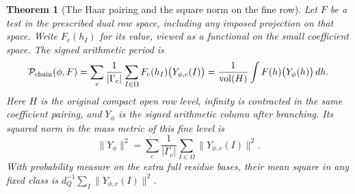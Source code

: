 \documentclass[a4paper,11pt]{article}
\newtheorem{theorem}[proposition]{Theorem}
\theoremstyle{definition}
\theoremstyle{remark}
\numberwithin{equation}{section}
\begin{document}
\begin{theorem}[The Haar pairing and the square norm on the fine row]
\leavevmode\label{thm:planehaar383}
Let \(F\) be a test in the prescribed dual row space, including
any imposed projection on that space. Write \(F_c(h_I)\) for
its value, viewed as a functional on the small coefficient
space. The signed arithmetic period is
\begin{equation}
 {\cal P}_{\rm chain}(\phi,F)
  =\sum_c\frac{1}{|\Gamma_c|}
       \sum_{I\in\Omega} F_c(h_I)\big(Y_{\phi,c}(I)\big)
  =\frac{1}{\operatorname{vol}(H)}
       \int F(h)\big(Y_{\phi}(h)\big)\,dh .
 \label{eq:flaghaar383}
\end{equation}
Here \(H\) is the original compact open row level, infinity
is contracted in the same coefficient pairing, and \(Y_\phi\)
is the signed arithmetic column after branching. Its squared
norm in the mass metric of this fine level is
\[
 \|Y_\phi\|^2
     =\sum_c\frac1{|\Gamma_c|}
            \sum_{I\in\Omega}\|Y_{\phi,c}(I)\|^2 .
\]
With probability measure on the extra full residue bases, their
mean square in any fixed class is
\(d_Q^{-1}\sum_I\|Y_{\phi,c}(I)\|^2\).
\end{theorem}
\end{document}
